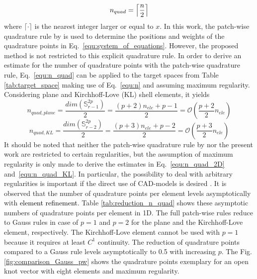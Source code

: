 \documentclass[3p]{elsarticle}
\newcommand{\reviewed}{\textcolor{black}}	%
\DeclarePairedDelimiter{\ceil}{\lceil}{\rceil}
\begin{document}
\begin{equation} \label{equ:n_quad}
	n_{quad} = \ceil[\Big]{\dfrac{n}{2}}
\end{equation}
where $\lceil \cdot \rceil$ is the nearest integer larger or equal to $x$. In this work, the patch-wise quadrature rule by \cite{Johannessen2017} is used to determine the positions and weights of the quadrature points in Eq.~\eqref{equ:system_of_equations}. However, the proposed method is not restricted to this explicit quadrature rule. In order to derive an estimate for the number of quadrature points with the patch-wise quadrature rule, Eq.~\eqref{equ:n_quad} can be applied to the target spaces from Table \ref{tab:target_space} making use of Eq.~\eqref{equ:n} and assuming maximum regularity. Considering plane and Kirchhoff-Love (KL) shell elements, it yields
\begin{equation}\label{equ:n_quad_2D}
	n_{quad,plane} = \dfrac{dim(\mathbb{S}_{r-1}^{2p})}{2} = \dfrac{(p+2)n_{ele}+p-1}{2} = \mathcal{O}(\dfrac{p+2}{2}n_{ele})
\end{equation}
\begin{equation}\label{equ:n_quad_KL}
	n_{quad,KL} = \dfrac{dim(\mathbb{S}_{r-2}^{2p})}{2} = \dfrac{(p+3)n_{ele}+p-2}{2} = \mathcal{O}(\dfrac{p+3}{2}n_{ele})
\end{equation}
It should be noted that neither the patch-wise quadrature rule by \cite{Johannessen2017} nor the present work are restricted to certain regularities, but the assumption of maximum regularity is only made to derive the estimates in Eq.~\eqref{equ:n_quad_2D} and~\eqref{equ:n_quad_KL}. In particular, the possibility to deal with arbitrary regularities is important if the direct use of CAD-models is desired \cite{Dornisch2021}. It is observed that the number of quadrature points per element levels asymptotically with \reviewed{element refinement}. Table \ref{tab:reduction_n_quad} shows these asymptotic numbers of quadrature points per element in 1D. The full patch-wise rules reduce to Gauss rules in case of $p=1$ and $p=2$ for the plane and the Kirchhoff-Love element, respectively. The Kirchhoff-Love element cannot be used with $p=1$ because it requires at least $C^1$ continuity. The reduction of quadrature points compared to a Gauss rule levels asymptotically to 0.5 with increasing $p$. The Fig. \ref{fig:comparison_Gauss_pw} shows the quadrature points exemplary for an open knot vector with eight elements and maximum regularity. \bigskip
\end{document}
